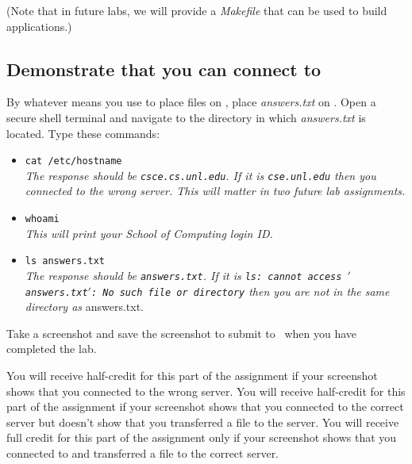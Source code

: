 (Note that in future labs, we will provide a \textit{Makefile} that can be used to build applications.)

\subsection*{Demonstrate that you can connect to \runtimeenvironment}

By whatever means you use to place files on \runtimeenvironment, place \textit{answers.txt} on \runtimeenvironment.
Open a secure shell terminal and navigate to the directory in which \textit{answers.txt} is located.
Type these commands:
\begin{itemize}
    \item[]\texttt{cat /etc/hostname} \\
    \textit{The response should be \texttt{csce.cs.unl.edu}.                %
    If it is \texttt{cse.unl.edu} then you connected to the wrong server.   %
    This will matter in two future lab assignments.}
    \item[]\texttt{whoami} \\
    \textit{This will print your School of Computing login ID.}
    \item[]\texttt{ls answers.txt} \\
    \textit{The response should be \texttt{answers.txt}.
    If it is \texttt{ls: cannot access $'$answers.txt$'$: No such file or directory} then you are not in the same directory as} answers.txt.
\end{itemize}

Take a screenshot and save the screenshot to submit to \filesubmission\ when you have completed the lab.

You will receive half-credit for this part of the assignment if your screenshot shows that you connected to the wrong server.
You will receive half-credit for this part of the assignment if your screenshot shows that you connected to the correct server but doesn't show that you transferred a file to the server.
You will receive full credit for this part of the assignment only if your screenshot shows that you connected to and transferred a file to the correct server.
